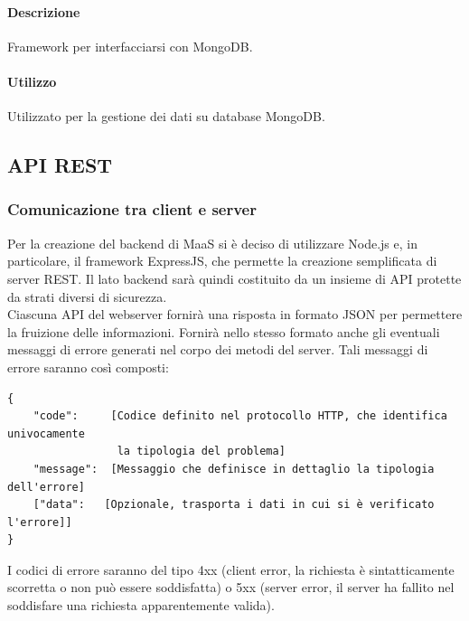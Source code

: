 \paragraph*{Descrizione}
Framework per interfacciarsi con MongoDB.

\paragraph*{Utilizzo}
Utilizzato per la gestione dei dati su database MongoDB.

\subsection{API REST}
\subsubsection{Comunicazione tra client e server}
Per la creazione del backend di MaaS si è deciso di utilizzare Node.js e, in particolare, il framework ExpressJS, che permette la creazione semplificata di server REST. Il lato backend sarà quindi costituito da un insieme di API protette da strati diversi di sicurezza. \\
Ciascuna API del webserver fornirà una risposta in formato JSON per permettere la fruizione delle informazioni. Fornirà nello stesso formato anche gli eventuali messaggi di errore generati nel corpo dei metodi del server. Tali messaggi di errore saranno così composti: 
\begin{verbatim}
{
    "code":     [Codice definito nel protocollo HTTP, che identifica univocamente
                 la tipologia del problema]
    "message":  [Messaggio che definisce in dettaglio la tipologia dell'errore]
    ["data":   [Opzionale, trasporta i dati in cui si è verificato l'errore]]
}
\end{verbatim}
I codici di errore saranno del tipo 4xx (client error, la richiesta è sintatticamente scorretta o non può essere soddisfatta) o 5xx (server error, il server ha fallito nel soddisfare una richiesta apparentemente valida).
